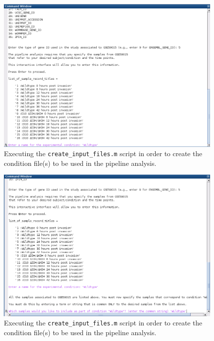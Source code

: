 \documentclass[final,letterpaper,twoside,12pt]{article}
\begin{document}
\begin{figure}[h]
\includegraphics[width=\textwidth]{create_files_5}
\caption{Executing the \texttt{create\_input\_files.m} script in order to create the condition file(s) to be used in the pipeline analysis.}
\label{figure:create_files_5}
\end{figure}

\begin{figure}[h]
\includegraphics[width=\textwidth]{create_files_6}
\caption{Executing the \texttt{create\_input\_files.m} script in order to create the condition file(s) to be used in the pipeline analysis.}
\label{figure:create_files_6}
\end{figure}
\end{document}

